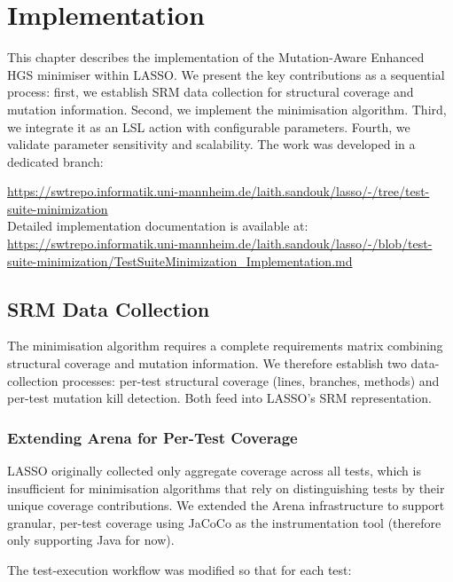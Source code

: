 \chapter{Implementation}
\label{chap:implementation}

This chapter describes the implementation of the Mutation-Aware Enhanced HGS minimiser within LASSO. We present the key contributions as a sequential process: first, we establish SRM data collection for structural coverage and mutation information. Second, we implement the minimisation algorithm. Third, we integrate it as an LSL action with configurable parameters. Fourth, we validate parameter sensitivity and scalability. The work was developed in a dedicated branch:\\[2pt]
{\centering
\small
\url{https://swtrepo.informatik.uni-mannheim.de/laith.sandouk/lasso/-/tree/test-suite-minimization}\\[0.5ex]
Detailed implementation documentation is available at:\\
\url{https://swtrepo.informatik.uni-mannheim.de/laith.sandouk/lasso/-/blob/test-suite-minimization/TestSuiteMinimization_Implementation.md}\par
}


\section{SRM Data Collection}

The minimisation algorithm requires a complete requirements matrix combining structural coverage and mutation information. We therefore establish two data-collection processes: per-test structural coverage (lines, branches, methods) and per-test mutation kill detection. Both feed into LASSO's SRM representation.

\subsection{Extending Arena for Per-Test Coverage}

LASSO originally collected only aggregate coverage across all tests, which is insufficient for minimisation algorithms that rely on distinguishing tests by their unique coverage contributions. We extended the Arena infrastructure to support granular, per-test coverage using JaCoCo as the instrumentation tool (therefore only supporting Java for now).

The test-execution workflow was modified so that for each test:

